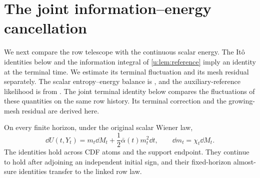\section{The joint information--energy cancellation}\label{u:sec:joint}

We next compare the row telescope with the continuous scalar energy. The It\^o identities below and the information integral of \cref{u:lem:reference} imply an identity at the terminal time. We estimate its terminal fluctuation and its mesh residual separately.
The scalar entropy--energy balance is
\cite[Lemma~4]{oai-typical-upper}, and the auxiliary-reference
likelihood is from \cite[Section~4, proof of Proposition~5]{oai-typical-upper}.
The joint terminal identity below compares the fluctuations of these
quantities on the same row history. Its terminal correction and the
growing-mesh residual are derived here.

\begin{lemma}\label{u:lem:ito}
On every finite horizon, under the original scalar Wiener law,
\begin{equation}\label{u:eq:field-ito}
 \dd U(t,Y_t)=m_t\dd M_t+\frac12\bar\alpha(t)m_t^2\dd t,
 \qquad \dd m_t=\chi_t\dd M_t.
\end{equation}
The identities hold across CDF atoms and the support endpoint. They continue to hold after adjoining an independent initial sign, and their fixed-horizon almost-sure identities transfer to the linked row law.
\end{lemma}

